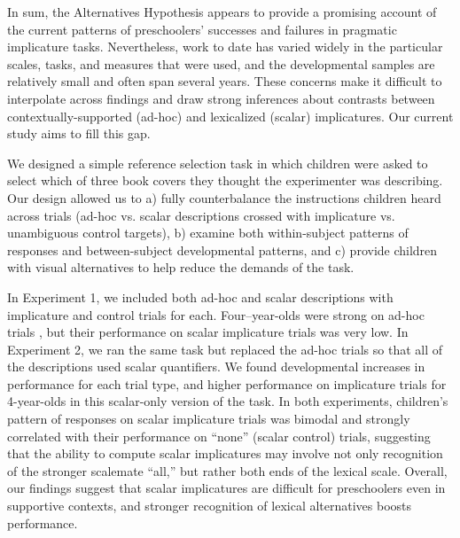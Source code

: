 \documentclass[10pt,letterpaper]{article}
\begin{document}
In sum, the Alternatives Hypothesis appears to provide a promising account of the current patterns of preschoolers' successes and failures in pragmatic implicature tasks. Nevertheless, work to date has varied widely in the particular scales, tasks, and measures that were used, and the developmental samples are relatively small and often span several years. These concerns make it difficult to interpolate across findings and draw strong inferences about contrasts between contextually-supported (ad-hoc) and lexicalized (scalar) implicatures. Our current study aims to fill this gap. 

We designed a simple reference selection task in which children were asked to select which of three book covers they thought the experimenter was describing. Our design allowed us to a) fully counterbalance the instructions children heard across trials (ad-hoc vs. scalar descriptions crossed with implicature vs. unambiguous control targets), b) examine both within-subject patterns of responses and between-subject developmental patterns, and c) provide children with visual alternatives to help reduce the demands of the task.

In Experiment 1, we included both ad-hoc and scalar descriptions with implicature and control trials for each. Four--year-olds were strong on ad-hoc trials \citep[similar to previous work, e.g.][]{stiller2014}, but their performance on scalar implicature trials was very low. In Experiment 2, we ran the same task but replaced the ad-hoc trials so that all of the descriptions used scalar quantifiers. We found developmental increases in performance for each trial type, and higher performance on implicature trials for 4-year-olds in this scalar-only version of the task. In both experiments, children's pattern of responses on scalar implicature trials was bimodal and strongly correlated with their performance on ``none'' (scalar control) trials, suggesting that the ability to compute scalar implicatures may involve not only recognition of the stronger scalemate ``all,'' but rather both ends of the lexical scale. Overall, our findings suggest that scalar implicatures are difficult for preschoolers even in supportive contexts, and stronger recognition of lexical alternatives boosts performance. 

\end{document}
